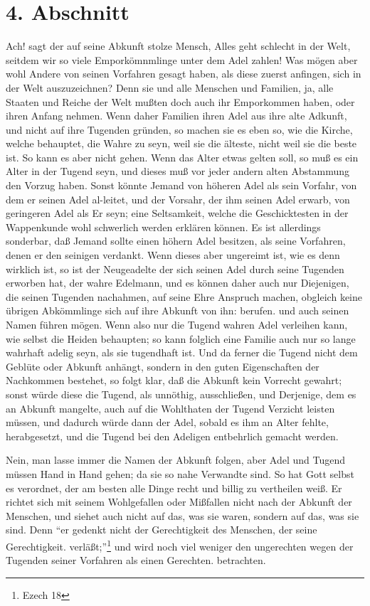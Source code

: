 \section{4. Abschnitt} \label{kap11_ab4}

Ach! sagt der auf seine Abkunft stolze Mensch, Alles geht schlecht in der Welt,
seitdem wir so viele Emporkömnmlinge unter dem Adel zahlen! Was mögen aber wohl
Andere von seinen Vorfahren gesagt haben, als diese zuerst anfingen, sich in der
Welt auszuzeichnen? Denn sie und alle Menschen und Familien, ja, alle Staaten
und Reiche der Welt mußten doch auch ihr Emporkommen haben, oder ihren Anfang
nehmen. Wenn daher Familien ihren Adel aus ihre alte Adkunft, und nicht auf ihre
Tugenden gründen, so machen sie es eben so, wie die Kirche, welche behauptet,
die Wahre zu seyn, weil sie die älteste, nicht weil sie die beste ist. So kann
es aber nicht gehen. Wenn das Alter etwas gelten soll, so muß es ein Alter in
der Tugend seyn, und dieses muß vor jeder andern alten Abstammung den Vorzug
haben. Sonst könnte Jemand von höheren Adel als sein Vorfahr, von dem er seinen
Adel al-leitet, und der Vorsahr, der ihm seinen Adel erwarb, von geringeren Adel
als Er seyn; eine Seltsamkeit, welche die Geschicktesten in der Wappenkunde wohl
schwerlich werden erklären können. Es ist allerdings sonderbar, daß Jemand
sollte einen höhern Adel besitzen, als seine Vorfahren, denen er den seinigen
verdankt. Wenn dieses aber ungereimt ist, wie es denn wirklich ist, so ist der
Neugeadelte der sich seinen Adel durch seine Tugenden erworben hat, der wahre
Edelmann, und es können daher auch nur Diejenigen, die seinen Tugenden
nachahmen, auf seine Ehre Anspruch machen, obgleich keine übrigen Abkömmlinge
sich auf ihre Abkunft von ihn: berufen. und auch seinen Namen führen mögen. Wenn
also nur die Tugend wahren Adel verleihen kann, wie selbst die Heiden behaupten;
so kann folglich eine Familie auch nur so lange wahrhaft adelig seyn, als sie
tugendhaft ist. Und da ferner die Tugend nicht dem Geblüte oder Abkunft anhängt,
sondern in den guten Eigenschaften der Nachkommen bestehet, so folgt klar, daß
die Abkunft kein Vorrecht gewahrt; sonst würde diese die Tugend, als unnöthig,
ausschließen, und Derjenige, dem es an Abkunft mangelte, auch auf die Wohlthaten
der Tugend Verzicht leisten müssen, und dadurch würde dann der Adel, sobald es
ihm an Alter fehlte, herabgesetzt, und die Tugend bei den Adeligen entbehrlich
gemacht werden.

\medskip

Nein, man lasse immer die Namen der Abkunft folgen, aber Adel und Tugend müssen
Hand in Hand gehen; da sie so nahe Verwandte sind. So hat Gott selbst es
verordnet, der am besten alle Dinge recht und billig zu vertheilen weiß. Er
richtet sich mit seinem Wohlgefallen oder Mißfallen nicht nach der Abkunft der
Menschen, und siehet auch nicht auf das, was sie waren, sondern auf das, was sie
sind. Denn "`er gedenkt nicht der Gerechtigkeit des Menschen, der seine
Gerechtigkeit. verläßt;"'\footnote{Ezech 18} und wird noch viel weniger den
ungerechten wegen der Tugenden seiner Vorfahren als einen Gerechten. betrachten.

